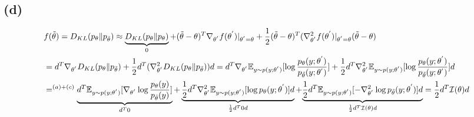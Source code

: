 \documentclass{article}
\begin{document}
\subsection*{(d)}
\begin{align*}
    & f(\tilde{\theta})=D_{KL}(p_{\theta}\|p_{\tilde{\theta}})\approx\underbrace{D_{KL}(p_{\theta}\|p_{\theta})}_{0}+(\tilde{\theta}-\theta)^{T}\nabla_{\theta^{'}}f(\theta^{'})|_{\theta^{'}=\theta}+\frac{1}{2}(\tilde{\theta}-\theta)^{T}(\nabla_{\theta^{'}}^{2}f(\theta^{'})|_{\theta^{'}=\theta}(\tilde{\theta}-\theta)                                                                                                                                                                                                  \\
    & =d^{T}\nabla_{\theta^{'}}D_{KL}(p_{\theta}\|p_{\tilde{\theta}})+\frac{1}{2}d^{T}(\nabla_{\theta^{'}}^{2}D_{KL}(p_{\theta}\|p_{\tilde{\theta}}))d=d^{T}\nabla_{\theta^{'}}\mathbb{E}_{y\sim p(y;\theta^{'})}[\log\frac{p_{\theta}(y;\theta^{'})}{p_{\tilde{\theta}}(y;\theta^{'})}]+\frac{1}{2}d^{T}\nabla_{\theta^{'}}^{2}\mathbb{E}_{y\sim p(y;\theta^{'})}[\log\frac{p_{\theta}(y;\theta^{'})}{p_{\tilde{\theta}}(y;\theta^{'})}]d                                                                                     \\
    & =^{(a)+(c)}\underbrace{d^{T}\mathbb{E}_{y\sim p(y;\theta^{'})}[\nabla_{\theta^{'}}\log\frac{p_{\theta}(y)}{p_{\tilde{\theta}}(y)}]}_{d^{T}0}+\underbrace{\frac{1}{2}d^{T}\nabla_{\theta^{'}}^{2}\mathbb{E}_{y\sim p(y;\theta^{'})}[\log p_{\theta}(y;\theta^{'})]d}_{\frac{1}{2}d^{T}0d}+\text{\ensuremath{\underbrace{\frac{1}{2}d^{T}\mathbb{E}_{y\sim p(y;\theta^{'})}[-\nabla_{\theta^{'}}^{2}\log p_{\tilde{\theta}}(y;\theta^{'})]d}_{\frac{1}{2}d^{T}\mathcal{I}(\theta)d}=\frac{1}{2}d^{T}\mathcal{I}(\theta)d}}
\end{align*}
\end{document}
